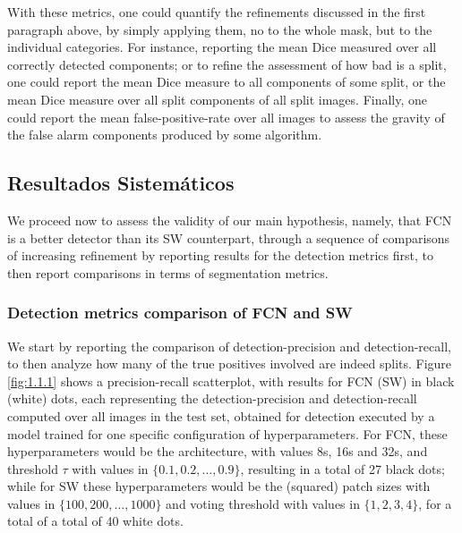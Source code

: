 \documentclass[a4paper,authoryear,review]{elsarticle}
\begin{document}
With these metrics, one could quantify the refinements discussed in the first paragraph above, by simply applying them, no to the whole mask, but to the individual categories. For instance, reporting the mean Dice measured over all correctly detected components; or to refine the assessment of how bad is a split, one could report the mean Dice measure to all components of some split, or the mean Dice measure over all split components of all split images. Finally, one could report the mean false-positive-rate over all images to assess the gravity of the false alarm components produced by some algorithm.

\subsection{Resultados Sistemáticos}

We proceed now to assess the validity of our main hypothesis, namely, that FCN is a better detector than its SW counterpart, through a sequence of comparisons of increasing refinement by reporting results for the detection metrics first, to then report comparisons in terms of segmentation metrics. 

\subsubsection{Detection metrics comparison of FCN and SW}

We start by reporting the comparison of detection-precision and detection-recall, to then analyze how many of the true positives involved are indeed splits.  Figure \ref{fig:1.1.1} shows a precision-recall scatterplot, with results for FCN (SW) in black (white) dots, each representing the detection-precision and detection-recall computed over all images in the test set,  obtained for detection executed by a model trained for one specific  configuration of hyperparameters. For FCN, these hyperparameters would be the architecture, with values 8s, 16s and 32s, and threshold $\tau$ with values in  $\{0.1, 0.2, \ldots, 0.9\}$, resulting in a total of 27 black dots; while for SW these hyperparameters would be the (squared) patch sizes with values in $\{100, 200, \ldots, 1000\}$ and voting threshold with values in $\{1, 2, 3, 4\}$, for a total of a total of 40 white dots. 
\end{document}

